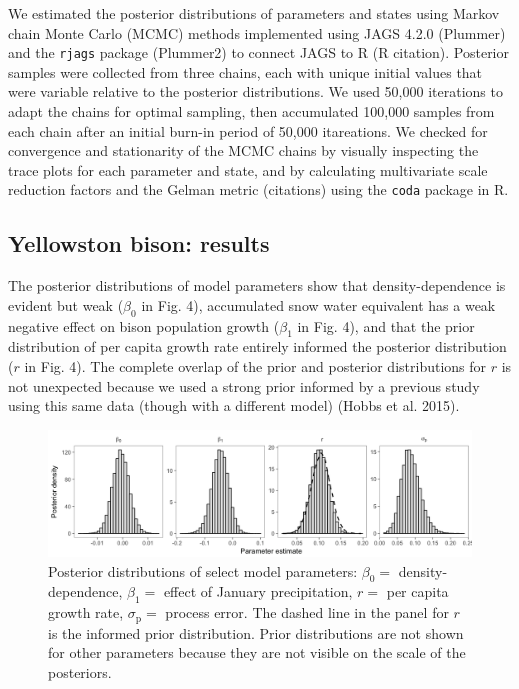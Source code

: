 \documentclass[12pt,]{article}
\begin{document}
We estimated the posterior distributions of parameters and states using
Markov chain Monte Carlo (MCMC) methods implemented using JAGS 4.2.0
(Plummer) and the \texttt{rjags} package (Plummer2) to connect JAGS to R
(R citation). Posterior samples were collected from three chains, each
with unique initial values that were variable relative to the posterior
distributions. We used 50,000 iterations to adapt the chains for optimal
sampling, then accumulated 100,000 samples from each chain after an
initial burn-in period of 50,000 itareations. We checked for convergence
and stationarity of the MCMC chains by visually inspecting the trace
plots for each parameter and state, and by calculating multivariate
scale reduction factors and the Gelman metric (citations) using the
\texttt{coda} package in R.

\subsection{Yellowston bison: results}\label{yellowston-bison-results}

The posterior distributions of model parameters show that
density-dependence is evident but weak (\(\beta_0\) in Fig. 4),
accumulated snow water equivalent has a weak negative effect on bison
population growth (\(\beta_1\) in Fig. 4), and that the prior
distribution of per capita growth rate entirely informed the posterior
distribution (\(r\) in Fig. 4). The complete overlap of the prior and
posterior distributions for \(r\) is not unexpected because we used a
strong prior informed by a previous study using this same data (though
with a different model) (Hobbs et al. 2015).

\begin{figure}[!ht]
  \centering
      \includegraphics{../figures/bison_post_params.png}
  \caption{Posterior distributions of select model parameters: $\beta_0=$ density-dependence, $\beta_1=$ effect of January precipitation, $r=$ per capita growth rate, $\sigma_{\text{p}}=$ process error. The dashed line in the panel for $r$ is the informed prior distribution. Prior distributions are not shown for other parameters because they are not visible on the scale of the posteriors.}
\end{figure}
\end{document}
